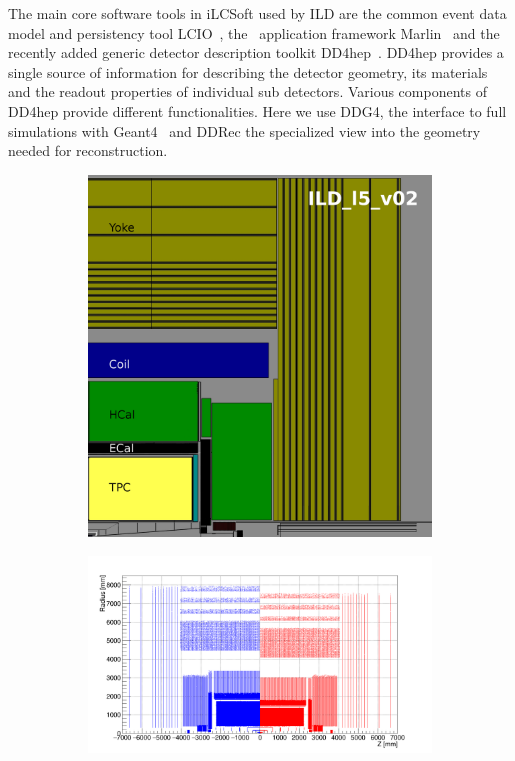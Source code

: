 The main core software tools in iLCSoft used by ILD are the common event data model and persistency tool LCIO~\cite{Gaede:2003ip},
the \CPP\ application framework Marlin~\cite{Gaede:2006pj} and the recently added generic detector description toolkit
DD4hep~\cite{Frank:2014zya,Frank:2015ivo}. DD4hep provides a single source of information for describing the detector geometry, its
materials and the readout properties of individual sub detectors. Various components of DD4hep provide different functionalities.
Here we use DDG4, the interface to full simulations with Geant4~\cite{Agostinelli:2002hh} and DDRec the specialized view into the
geometry needed for reconstruction.
%
%
\begin{figure}[b!]
  \begin{subfigure}{0.40\hsize}
    \includegraphics[width=\textwidth]{Modelling/fig/ILD_l5_v02_sideview_gimp_2.jpg}
    \caption{ \label{fig:sim_model_quad}}
  \end{subfigure}
  \begin{subfigure}{0.60\hsize}
    \includegraphics[width=\textwidth]{Modelling/fig/hits_rz_small_large_ILD.png}

\end{subfigure}
\end{figure}
